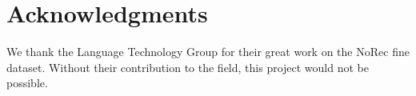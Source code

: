 \documentclass[11pt,a4paper]{article}
\begin{document}
    

\section*{Acknowledgments}
We thank the Language Technology Group for their great work on the NoRec fine dataset. Without their contribution to the field, this project would not be possible.   




\end{document}

